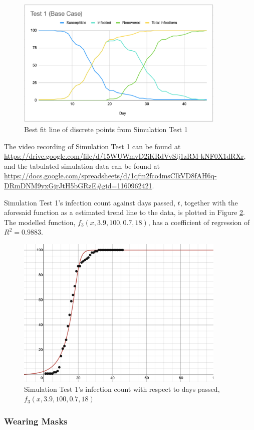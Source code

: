 \documentclass[a4paper,titlepage]{article}
\begin{document}
\begin{figure}[htbp]
    \centering
    \includegraphics[width=10cm]{simT1.png}
    \caption{Best fit line of discrete points from Simulation Test 1}
    \label{fig:simT1}
\end{figure}

The video recording of Simulation Test 1 can be found at \url{https://drive.google.com/file/d/15WUWmvD2iKRdVvSlj1zRM-kNF0X1dRXr}, and the tabulated simulation data can be found at \url{https://docs.google.com/spreadsheets/d/1qfm2fco4msClkVD8fAH6q-DRmDNM9yxGjrJtH5bGRzE#gid=1160962421}.

Simulation Test 1's infection count against days passed, $t$, together with the aforesaid function as a estimated trend line to the data, is plotted in Figure \ref{fig:simG1}. The modelled function, $f_3(x,3.9,100,0.7,18)$, has a coefficient of regression of $R^2=0.9883$.

\begin{figure}[htbp]
    \centering
    \includegraphics[width=10cm]{simG1.png}
    \caption{Simulation Test 1's infection count with respect to days passed, $f_3(x,3.9,100,0.7,18)$}
    \label{fig:simG1}
\end{figure}

\subsubsection{Wearing Masks}
\end{document}
